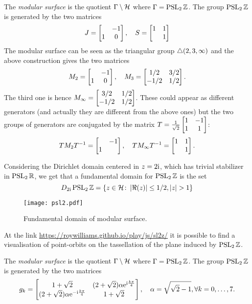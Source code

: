 \begin{nese}
\label{ese:modular_surface}
The \emph{modular surface} is the quotient $\Gamma\setminus\mathcal{H}$ where $\Gamma=\operatorname{PSL}_{2}\mathbb{Z}$. The group $\operatorname{PSL}_{2}\mathbb{Z}$ is generated by the two matrices
\[
J=\begin{bmatrix} &-1\\1&0 \end{bmatrix},\quad S=\begin{bmatrix} 1&1\\&1 \end{bmatrix}
\]
The modular surface can be seen as the triangular group $\bigtriangleup(2,3,\infty)$ and the above construction gives the two matrices
\[
M_{2}=\begin{bmatrix} &-1\\1&0 \end{bmatrix},\quad M_{3}=\begin{bmatrix} 1/2&3/2\\-1/2&1/2 \end{bmatrix}.
\]
The third one is hence $M_{\infty}=\begin{bmatrix} 3/2&1/2\\-1/2&1/2 \end{bmatrix}$. These could appear as different generators (and actually they are different from the above ones) but the two groups of generators are conjugated by the matrix $T=\frac{1}{\sqrt{2}}\begin{bmatrix} 1&-1\\1&1 \end{bmatrix}$:
\[ 
TM_{2}T^{-1}=\begin{bmatrix} &-1\\1& \end{bmatrix},\quad TM_{\infty}T^{-1}=\begin{bmatrix} 1&1\\&1 \end{bmatrix}.
\]
\end{nese}

Considering the Dirichlet domain centered in $z=2\mathrm{i}$, which has trivial stabilizer in $\operatorname{PSL}_{2}\mathbb{R}$, we get that a fundamental domain for $\operatorname{PSL}_{2}\mathbb{Z}$ is the set
\[
D_{2\imi}\PSL_{2}\Z=\left\{
z\in\Hilb\colon \abs{\Re(z)}\leq1/2,\abs{z}>1
\right\}
\]

\begin{figure}[H]
\centering
\texttt{[image: psl2.pdf]}
  \noindent\\
  \decoRule
  \caption{Fundamental domain of modular surface.}
  \label{fig:fund_dom_psl2}
\end{figure}



At the link \url{https://roywilliams.github.io/play/js/sl2z/} it is possible to find a visualisation of point-orbits on the tassellation of the plane induced by $\operatorname{PSL}_{2}\mathbb{Z}$.

\begin{nese}
\label{ese:bolza_surface}
The \emph{modular surface} is the quotient $\Gamma\setminus\mathcal{H}$ where $\Gamma=\operatorname{PSL}_{2}\mathbb{Z}$. The group $\operatorname{PSL}_{2}\mathbb{Z}$ is generated by the two matrices
\[
g_{k}=\begin{bmatrix} 
1+\sqrt{2} & (2+\sqrt{2})\alpha\mathrm{e}^{\mathrm{i}\frac{k\pi}{4}}\\
(2+\sqrt{2})\alpha\mathrm{e}^{-\mathrm{i}\frac{k\pi}{4}} & 1+\sqrt{2}
 \end{bmatrix},\quad\alpha=\sqrt{\sqrt{2}-1},\forall k=0,\ldots,7.
\]
\end{nese}

